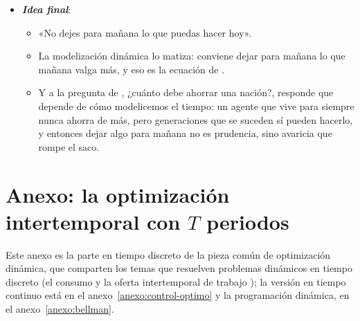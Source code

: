 \documentclass[11pt]{article}
\begin{document}
\begin{itemize}
\begin{itemize}
  \item El agente de vida infinita sirve para pensar el largo plazo; las preguntas más urgentes de hoy (las pensiones, la deuda, el clima) son conflictos entre generaciones y piden un modelo en el que las generaciones existan.

  \item Ninguno de los 2~es «el» modelo: como dijo el estadístico  en 1979, «todos los modelos son falsos, pero algunos son útiles»,\footnote{En el original: «All models are wrong but some are useful», en \textcite[pág.~202]{Box1979Robustness}. La idea ya estaba en un artículo suyo de 1976, y la repitió en su manual con  de 1987.} y cada uno lo es para su pregunta.
  \end{itemize}
\item \textbf{\emph{Idea final}}:
  \begin{itemize}
  \item «No dejes para mañana lo que puedas hacer hoy».

  \item La modelización dinámica lo matiza: conviene dejar para mañana lo que mañana valga más, y eso es la ecuación de .

  \item Y a la pregunta de , ¿cuánto debe ahorrar una nación?, responde que depende de cómo modelicemos el tiempo: un agente que vive para siempre nunca ahorra de más, pero generaciones que se suceden sí pueden hacerlo, y entonces dejar algo para mañana no es prudencia, sino avaricia que rompe el saco.
  \end{itemize}
\end{itemize}

\clearpage
\appendix

\section{Anexo: la optimización intertemporal con $T$ periodos}\label{anexo:optimizacion}

\begin{notaopositor}
Este anexo es la parte en tiempo discreto de la pieza común de optimización dinámica, que comparten los temas que resuelven problemas dinámicos en tiempo discreto (el consumo  y la oferta intertemporal de trabajo ); la versión en tiempo continuo está en el anexo~\ref{anexo:control-optimo} y la programación dinámica, en el anexo~\ref{anexo:bellman}.
\end{notaopositor}
\end{document}
